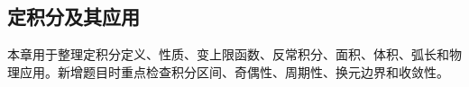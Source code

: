 \subsection{定积分及其应用}

\begin{knowledgeBox}
本章用于整理定积分定义、性质、变上限函数、反常积分、面积、体积、弧长和物理应用。新增题目时重点检查积分区间、奇偶性、周期性、换元边界和收敛性。
\end{knowledgeBox}
